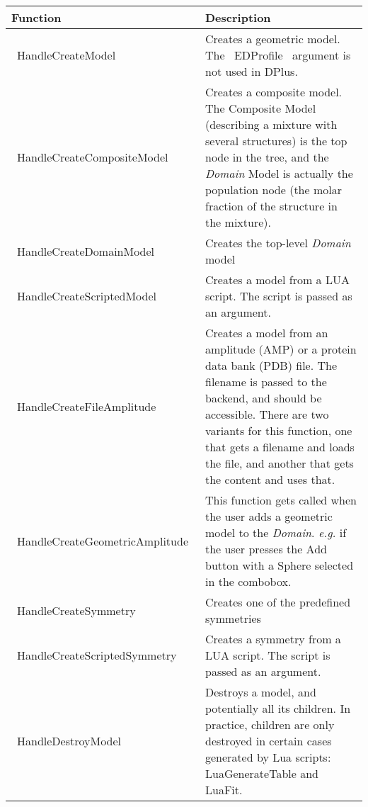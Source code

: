 \documentclass[12pt]{article}
\begin{document}
\begin{center}
	\begin{longtable}{|l|p{7cm}|}
		\hline
		\textbf{Function} & \textbf{Description} \\ \hline
		~HandleCreateModel~ & Creates a geometric model. The ~EDProfile~ argument is not used in DPlus. \\ \hline
		~HandleCreateCompositeModel~ & Creates a composite model. The Composite Model (describing a mixture with several structures) is the top node in the tree, and the \emph{Domain} Model is actually the population node (the molar fraction of the structure in the mixture). \\ \hline 
		~HandleCreateDomainModel~ & Creates the top-level \emph{Domain} model \\ \hline
		~HandleCreateScriptedModel~ & Creates a model from a LUA script. The script is passed as an argument. \\ \hline
		~HandleCreateFileAmplitude~ & Creates a model from an amplitude (AMP) or a protein data bank (PDB) file. The filename is passed to the backend, and should be accessible. There are two variants for this function, one that gets a filename and loads the file, and another that gets the content and uses that. \\ \hline 
		~HandleCreateGeometricAmplitude~ & This function gets called when the user adds a geometric model to the \emph{Domain}. \textit{e.g.} if the user presses the Add button with a Sphere selected in the combobox. \\ \hline 
		~HandleCreateSymmetry~ & Creates one of the predefined symmetries \\ \hline
		~HandleCreateScriptedSymmetry~ & Creates a symmetry from a LUA script. The script is passed as an argument. \\ \hline
		~HandleDestroyModel~ & Destroys a model, and potentially all its children. In practice, children are only destroyed in certain cases generated by Lua scripts: LuaGenerateTable and LuaFit.\\ \hline
	\end{longtable}
\end{center}
\end{document}
